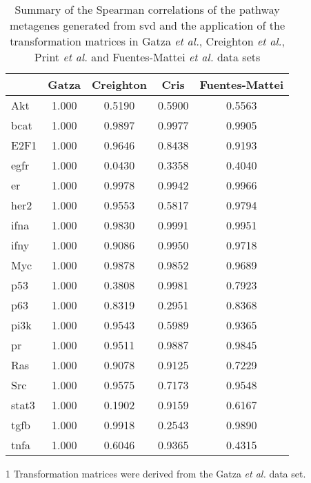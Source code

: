\begin{table}[htpb]
	\centering
	\begin{threeparttable}
	\caption{Summary of the Spearman correlations of the pathway metagenes generated from \gls{svd} and the application of the transformation matrices in Gatza \textit{et al.}, Creighton \textit{et al.}, Print \textit{et al.} and Fuentes-Mattei \textit{et al.} data sets}
	\label{tab:svd_vs_tm_path}
		\begin{tabular}{lcccc}
			& Gatza & Creighton & Cris & Fuentes-Mattei\\
			\hline
			\hline
			\rule{0pt}{2.25ex}Akt & 1.000 & 0.5190 & 0.5900 & 0.5563 \\
			\gls{bcat}            & 1.000 & 0.9897 & 0.9977 & 0.9905 \\
			E2F1                  & 1.000 & 0.9646 & 0.8438 & 0.9193 \\
			\gls{egfr}            & 1.000 & 0.0430 & 0.3358 & 0.4040 \\
			\gls{er}              & 1.000 & 0.9978 & 0.9942 & 0.9966 \\
			\gls{her2}            & 1.000 & 0.9553 & 0.5817 & 0.9794 \\
			\gls{ifna}            & 1.000 & 0.9830 & 0.9991 & 0.9951 \\
			\gls{ifny}            & 1.000 & 0.9086 & 0.9950 & 0.9718 \\
			Myc                   & 1.000 & 0.9878 & 0.9852 & 0.9689 \\
			p53                   & 1.000 & 0.3808 & 0.9981 & 0.7923 \\
			p63                   & 1.000 & 0.8319 & 0.2951 & 0.8368 \\
			\gls{pi3k}            & 1.000 & 0.9543 & 0.5989 & 0.9365 \\
			\gls{pr}              & 1.000 & 0.9511 & 0.9887 & 0.9845 \\
			Ras                   & 1.000 & 0.9078 & 0.9125 & 0.7229 \\
			Src                   & 1.000 & 0.9575 & 0.7173 & 0.9548 \\
			\gls{stat3}           & 1.000 & 0.1902 & 0.9159 & 0.6167 \\
			\gls{tgfb}            & 1.000 & 0.9918 & 0.2543 & 0.9890 \\
			\gls{tnfa}            & 1.000 & 0.6046 & 0.9365 & 0.4315 \\
			\hline
			\hline
		\end{tabular}
		\begin{tablenotes}
			\begin{footnotesize}
				\item [1] Transformation matrices were derived from the Gatza \textit{et al.} data set.
			\end{footnotesize}
		\end{tablenotes}
	\end{threeparttable}
\end{table}

